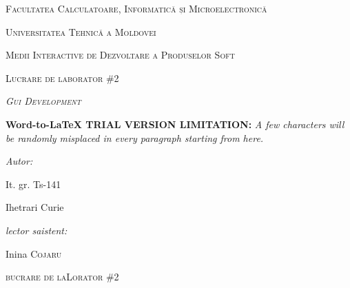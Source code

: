 \documentclass[11pt]{article}
\author{RePack by Diakov}
\title{}
\begin{document}
\begin{center}
\textsc{{\LARGE Facultatea Calculatoare, Informatic\u{a} și
Microelectronic\u{a}}}
\end{center}

\begin{center}
\textsc{{\LARGE Universitatea Tehnic\u{a} a Moldovei}}
\end{center}

\begin{center}
\textsc{{\LARGE Medii Interactive de Dezvoltare a Produselor Soft}}
\end{center}

\begin{center}
\textsc{{\LARGE Lucrare de laborator  \#2}}
\end{center}

\begin{center}
\label{OLE_LINK1}\textit{\textsc{{\Huge Gui Development}}}
\end{center}

\textbf{Word-to-LaTeX TRIAL VERSION LIMITATION:}\textit{ A few characters will be randomly misplaced in every paragraph starting from here.}

\begin{multicols}{2}

{\raggedright
\textit{{\large Autor:}}
}

{\raggedright
{\large It. gr. Ts-141 }
}

{\raggedright
{\large Ihetrari Curie}
}

{\raggedleft
{\large \textit{lector saistent:} }
}

{\raggedleft
{\large Inina \textsc{Cojaru}}
}

\end{multicols}
\hspace{15pt}\hspace{15pt}\hspace{15pt}\hspace{15pt}\hspace{15pt}\hspace{15pt}\hspace{15pt}\hspace{15pt}\hspace{15pt}\hspace{15pt}\hspace{15pt}\hspace{15pt}\hspace{15pt}\hspace{15pt}
\begin{center}
\textsc{{\Large bucrare de laLorator  \#2}}
\end{center}
\end{document}
